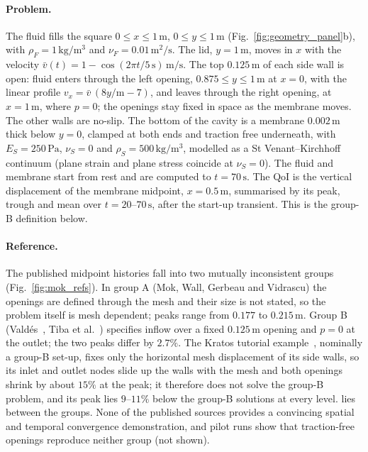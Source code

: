 \paragraph{Problem.}
The fluid fills the square $0 \le x \le 1\,\mathrm{m}$, $0 \le y \le 1\,\mathrm{m}$ (Fig.~\ref{fig:geometry_panel}b), with $\rho_F = 1\,\mathrm{kg/m^3}$ and $\nu_F = 0.01\,\mathrm{m^2/s}$.
The lid, $y = 1\,\mathrm{m}$, moves in $x$ with the velocity $\bar{v}(t) = 1 - \cos(2\pi t/5\,\mathrm{s})\,\mathrm{m/s}$.
The top $0.125\,\mathrm{m}$ of each side wall is open: fluid enters through the left opening, $0.875 \le y \le 1\,\mathrm{m}$ at $x = 0$, with the linear profile $v_x = \bar{v}\,(8y/\mathrm{m} - 7)$, and leaves through the right opening, at $x = 1\,\mathrm{m}$, where $p = 0$; the openings stay fixed in space as the membrane moves.
The other walls are no-slip.
The bottom of the cavity is a membrane $0.002\,\mathrm{m}$ thick below $y = 0$, clamped at both ends and traction free underneath, with $E_S = 250\,\mathrm{Pa}$, $\nu_S = 0$ and $\rho_S = 500\,\mathrm{kg/m^3}$, modelled as a St Venant--Kirchhoff continuum (plane strain and plane stress coincide at $\nu_S = 0$).
The fluid and membrane start from rest and are computed to $t = 70\,\mathrm{s}$.
The QoI is the vertical displacement of the membrane midpoint, $x = 0.5\,\mathrm{m}$, summarised by its peak, trough and mean over $t = 20$--$70\,\mathrm{s}$, after the start-up transient.
This is the group-B definition below.

\paragraph{Reference.}
The published midpoint histories fall into two mutually inconsistent groups (Fig.~\ref{fig:mok_refs}).
In group A (Mok, Wall, Gerbeau and Vidrascu) the openings are defined through the mesh and their size is not stated, so the problem itself is mesh dependent; peaks range from $0.177$ to $0.215\,\mathrm{m}$.
Group B (Vald\'es~\citep{Valdes2007}, Tiba et al.~\citep{Tiba2026}) specifies inflow over a fixed $0.125\,\mathrm{m}$ opening and $p = 0$ at the outlet; the two peaks differ by $2.7\%$.
The Kratos tutorial example~\citep{KratosLDC}, nominally a group-B set-up, fixes only the horizontal mesh displacement of its side walls, so its inlet and outlet nodes slide up the walls with the mesh and both openings shrink by about $15\%$ at the peak; it therefore does not solve the group-B problem, and its peak lies $9$--$11\%$ below the group-B solutions at every level.
\citet{Kassiotis2011} lies between the groups.
None of the published sources provides a convincing spatial and temporal convergence demonstration, and pilot runs show that traction-free openings reproduce neither group (not shown).

